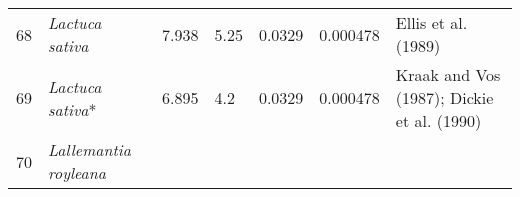 \documentclass[]{article}
\begin{document}
\begin{longtable}[]{@{}lllllll@{}}
\begin{minipage}[t]{0.05\columnwidth}
68\strut
\end{minipage} & \begin{minipage}[t]{0.23\columnwidth}\raggedright
\emph{Lactuca sativa}\strut
\end{minipage} & \begin{minipage}[t]{0.05\columnwidth}\raggedright
7.938\strut
\end{minipage} & \begin{minipage}[t]{0.08\columnwidth}\raggedright
5.25\strut
\end{minipage} & \begin{minipage}[t]{0.08\columnwidth}\raggedright
0.0329\strut
\end{minipage} & \begin{minipage}[t]{0.08\columnwidth}\raggedright
0.000478\strut
\end{minipage} & \begin{minipage}[t]{0.23\columnwidth}\raggedright
Ellis et al. (1989)\strut
\end{minipage}\tabularnewline
\begin{minipage}[t]{0.05\columnwidth}\raggedright
69\strut
\end{minipage} & \begin{minipage}[t]{0.23\columnwidth}\raggedright
\emph{Lactuca sativa}*\strut
\end{minipage} & \begin{minipage}[t]{0.05\columnwidth}\raggedright
6.895\strut
\end{minipage} & \begin{minipage}[t]{0.08\columnwidth}\raggedright
4.2\strut
\end{minipage} & \begin{minipage}[t]{0.08\columnwidth}\raggedright
0.0329\strut
\end{minipage} & \begin{minipage}[t]{0.08\columnwidth}\raggedright
0.000478\strut
\end{minipage} & \begin{minipage}[t]{0.23\columnwidth}\raggedright
Kraak and Vos (1987); Dickie et al. (1990)\strut
\end{minipage}\tabularnewline
\begin{minipage}[t]{0.05\columnwidth}\raggedright
70\strut
\end{minipage} & \begin{minipage}[t]{0.23\columnwidth}\raggedright
\emph{Lallemantia royleana}\strut
\end{minipage} & \begin{minipage}[t]{0.05\columnwidth}\raggedright

\end{minipage}
\end{longtable}
\end{document}
